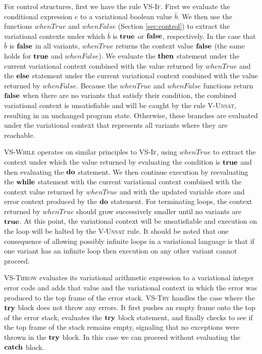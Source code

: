 \documentclass[12pt,oneside]{book}
\begin{document}
For control structures, first we have the rule \textsc{VS-If}. First we evaluate the conditional expression $e$ to a variational boolean value $\bar{b}$.
We then use the functions $\mathit{whenTrue}$ and $\mathit{whenFalse}$ (Section \ref{sec:control}) to extract the variational contexts under
which $\bar{b}$ is $\textbf{\textup{\textrm{true}}}$ or $\textbf{\textup{\textrm{false}}}$, respectively. In the case that $\bar{b}$ is $\textbf{\textup{\textrm{false}}}$ in all variants, $\mathit{whenTrue}$
returns the context value $\textbf{\textup{\textrm{false}}}$ (the same holds for $\textbf{\textup{\textrm{true}}}$ and $\mathit{whenFalse}$). We evaluate the $\textbf{\textup{\textrm{then}}}$
statement under the current variational context combined with the value returned by $\mathit{whenTrue}$ and the $\textbf{\textup{\textrm{else}}}$ statement under
the current variational context combined with the value returned by $\mathit{whenFalse}$. Because the $\mathit{whenTrue}$ and $\mathit{whenFalse}$
functions return $\textbf{\textup{\textrm{false}}}$ when there are no variants that satisfy their condition, the combined variational context is unsatisfiable and will be
caught by the rule \textsc{V-Unsat}, resulting in an unchanged program state. Otherwise, these branches are evaluated under the variational context
that represents all variants where they are reachable.

\textsc{VS-While} operates on similar principles to \textsc{VS-If}, using $\mathit{whenTrue}$ to extract the context under which the value
returned by evaluating the condition is $\textbf{\textup{\textrm{true}}}$ and then evaluating the $\textbf{\textup{\textrm{do}}}$ statement. We then continue execution
by reevaluating the $\textbf{\textup{\textrm{while}}}$ statement with the current variational context combined with the context value returned by $\mathit{whenTrue}$
and with the updated variable store and error context produced by the $\textbf{\textup{\textrm{do}}}$ statement.
For terminating loops, the context
returned by $\mathit{whenTrue}$ should grow successively smaller until no variants are $\textbf{\textup{\textrm{true}}}$. At this point, the variational context will be
unsatisfiable and execution on the loop will be halted by the \textsc{V-Unsat} rule. It should be noted that one consequence of allowing possibly infinite
loops in a variational language is that if one variant has an infinite loop then execution on any other variant cannot proceed.

\textsc{VS-Throw} evaluates its variational arithmetic expression to a variational integer error code and adds that value and the variational context
in which the error was produced to the top frame of the error stack. \textsc{VS-Try} handles the case where the $\textbf{\textup{\textrm{try}}}$ block does not throw
any errors. It first pushes an empty frame onto the top of the error stack, evaluates the $\textbf{\textup{\textrm{try}}}$ block statement, and finally checks to see if
the top frame of the stack remains empty, signaling that no exceptions were thrown in the $\textbf{\textup{\textrm{try}}}$ block. In this case we can proceed without evaluating the $\textbf{\textup{\textrm{catch}}}$ block.
\end{document}
